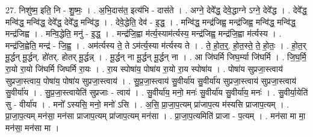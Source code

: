 \documentclass[17pt]{extarticle}
\begin{document}
27. निशु॑ष्म॒ इति॒ नि - शु॒ष्मः॒ । . अ॒भि॒दास॑त॒ इत्य॑भि - दास॑ते । . अग्ने॒ देवे᳚द्ध॒ देवे॒द्धाग्ने ऽग्ने॒ देवे᳚द्ध । . देवे᳚द्ध॒ मन्वि॑द्ध॒ मन्वि॑द्ध॒ देवे᳚द्ध॒ देवे᳚द्ध॒ मन्वि॑द्ध । . देवे॒द्धेति॒ देव॑ - इ॒द्ध॒ । . मन्वि॑द्ध॒ मन्द्र॑जिह्व॒ मन्द्र॑जिह्व॒ मन्वि॑द्ध॒ मन्वि॑द्ध॒ मन्द्र॑जिह्व । . मन्वि॒द्धेति॒ मनु॑ - इ॒द्ध॒ । . मन्द्र॑जि॒ह्वा म॑र्त्य॒स्याम॑र्त्यस्य॒ मन्द्र॑जिह्व॒ मन्द्र॑जि॒ह्वा म॑र्त्यस्य । . मन्द्र॑जि॒ह्वेति॒ मन्द्र॑ - जि॒ह्व॒ । . अम॑र्त्यस्य ते॒ ते ऽम॑र्त्य॒स्या म॑र्त्यस्य ते । . ते॒ हो॒त॒र्॒. हो॒त॒स्ते॒ ते॒ हो॒तः॒ । . हो॒त॒र् मू॒र्द्धन् मू॒र्द्धन्. हो॑तर्. होतर् मू॒र्द्धन्न् । . मू॒र्द्धन् ना मू॒र्द्धन् मू॒र्द्धन् ना । . आ जि॑घर्मि जिघ॒र्म्या जि॑घर्मि । . जि॒घ॒र्मि॒ रा॒यो रा॒यो जि॑घर्मि जिघर्मि रा॒यः । . रा॒य स्पोषा॑य॒ पोषा॑य रा॒यो रा॒य स्पोषा॑य । . पोषा॑य सुप्रजा॒स्त्वाय॑ सुप्रजा॒स्त्वाय॒ पोषा॑य॒ पोषा॑य सुप्रजा॒स्त्वाय॑ । . सु॒प्र॒जा॒स्त्वाय॑ सु॒वीर्या॑य सु॒वीर्या॑य सुप्रजा॒स्त्वाय॑ सुप्रजा॒स्त्वाय॑ सु॒वीर्या॑य । . सु॒प्र॒जा॒स्त्वायेति॑ सुप्रजाः - त्वाय॑ । . सु॒वीर्या॑य॒ मनो॒ मनः॑ सु॒वीर्या॑य सु॒वीर्या॑य॒ मनः॑ । . सु॒वीर्या॒येति॑ सु - वीर्या॑य । . मनो᳚ ऽस्यसि॒ मनो॒ मनो॑ ऽसि । . अ॒सि॒ प्रा॒जा॒प॒त्यम् प्रा॑जाप॒त्य म॑स्यसि प्राजाप॒त्यम् । . प्रा॒जा॒प॒त्यम् मन॑सा॒ मन॑सा प्राजाप॒त्यम् प्रा॑जाप॒त्यम् मन॑सा । . प्रा॒जा॒प॒त्यमिति॑ प्राजा - प॒त्यम् । . मन॑सा मा मा॒ मन॑सा॒ मन॑सा मा । \newline
\end{document}
